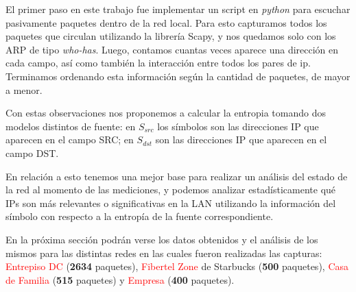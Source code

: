 El primer paso en este trabajo fue implementar un script en \emph{python} para escuchar pasivamente
paquetes dentro de la red local. Para esto capturamos todos los paquetes que circulan utilizando la 
librería Scapy, y nos quedamos solo con los ARP de tipo \emph{who-has}. Luego, contamos cuantas veces
aparece una direcci\'on en cada campo, as\'i como tambi\'en la interacci\'on entre todos los pares
de ip. Terminamos ordenando esta información según la cantidad de paquetes, de mayor a menor.


Con estas observaciones nos proponemos a calcular la entropia tomando dos modelos distintos de fuente:
en \textbf{$S_{src}$} los símbolos son las direcciones IP que aparecen en el campo SRC; en 
\textbf{$S_{dst}$} son las direcciones IP que aparecen en el campo DST.


En relación a esto tenemos una mejor base para realizar un análisis del estado de 
la red al momento de las mediciones, y podemos analizar estadísticamente qué IPs 
son más relevantes o significativas en la LAN utilizando la información del símbolo 
con respecto a la entropía de la fuente correspondiente.


En la próxima sección podrán verse los datos obtenidos y el análisis de los mismos
para las distintas redes en las cuales fueron realizadas las capturas: 
\textcolor{red}{Entrepiso DC} (\textbf{2634} paquetes), \textcolor{red}{Fibertel Zone} de Starbucks (\textbf{500} paquetes),
\textcolor{red}{Casa de Familia} (\textbf{515} paquetes) y \textcolor{red}{Empresa} (\textbf{400} paquetes).



